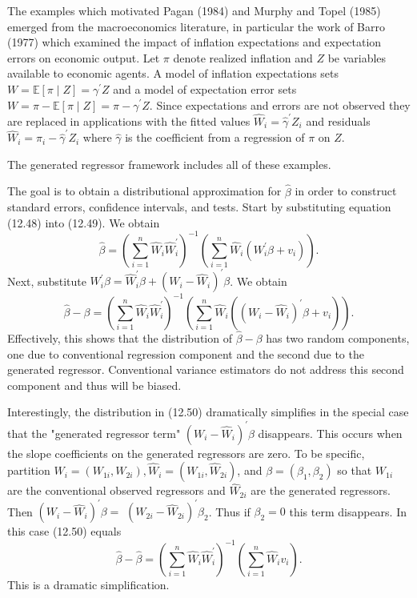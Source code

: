 \documentclass[10pt]{article}
\begin{document}
The examples which motivated Pagan (1984) and Murphy and Topel (1985) emerged from the macroeconomics literature, in particular the work of Barro (1977) which examined the impact of inflation expectations and expectation errors on economic output. Let $\pi$ denote realized inflation and $Z$ be variables available to economic agents. A model of inflation expectations sets $W=\mathbb{E}[\pi \mid Z]=\gamma^{\prime} Z$ and a model of expectation error sets $W=\pi-\mathbb{E}[\pi \mid Z]=\pi-\gamma^{\prime} Z$. Since expectations and errors are not observed they are replaced in applications with the fitted values $\widehat{W}_{i}=\widehat{\gamma}^{\prime} Z_{i}$ and residuals $\widehat{W}_{i}=\pi_{i}-\widehat{\gamma}^{\prime} Z_{i}$ where $\widehat{\gamma}$ is the coefficient from a regression of $\pi$ on $Z$.

The generated regressor framework includes all of these examples.

The goal is to obtain a distributional approximation for $\widehat{\beta}$ in order to construct standard errors, confidence intervals, and tests. Start by substituting equation (12.48) into (12.49). We obtain
$$
\widehat{\beta}=\left(\sum_{i=1}^{n} \widehat{W}_{i} \widehat{W}_{i}^{\prime}\right)^{-1}\left(\sum_{i=1}^{n} \widehat{W}_{i}\left(W_{i}^{\prime} \beta+v_{i}\right)\right) .
$$
Next, substitute $W_{i}^{\prime} \beta=\widehat{W}_{i}^{\prime} \beta+\left(W_{i}-\widehat{W}_{i}\right)^{\prime} \beta$. We obtain
$$
\widehat{\beta}-\beta=\left(\sum_{i=1}^{n} \widehat{W}_{i} \widehat{W}_{i}^{\prime}\right)^{-1}\left(\sum_{i=1}^{n} \widehat{W}_{i}\left(\left(W_{i}-\widehat{W}_{i}\right)^{\prime} \beta+v_{i}\right)\right) .
$$
Effectively, this shows that the distribution of $\widehat{\beta}-\beta$ has two random components, one due to conventional regression component and the second due to the generated regressor. Conventional variance estimators do not address this second component and thus will be biased.

Interestingly, the distribution in (12.50) dramatically simplifies in the special case that the "generated regressor term" $\left(W_{i}-\widehat{W}_{i}\right)^{\prime} \beta$ disappears. This occurs when the slope coefficients on the generated regressors are zero. To be specific, partition $W_{i}=\left(W_{1 i}, W_{2 i}\right), \widehat{W}_{i}=\left(W_{1 i}, \widehat{W}_{2 i}\right)$, and $\beta=\left(\beta_{1}, \beta_{2}\right)$ so that $W_{1 i}$ are the conventional observed regressors and $\widehat{W}_{2 i}$ are the generated regressors. Then $\left(W_{i}-\widehat{W}_{i}\right)^{\prime} \beta=$ $\left(W_{2 i}-\widehat{W}_{2 i}\right)^{\prime} \beta_{2}$. Thus if $\beta_{2}=0$ this term disappears. In this case (12.50) equals
$$
\widehat{\beta}-\widehat{\beta}=\left(\sum_{i=1}^{n} \widehat{W}_{i} \widehat{W}_{i}^{\prime}\right)^{-1}\left(\sum_{i=1}^{n} \widehat{W}_{i} v_{i}\right) .
$$
This is a dramatic simplification.
\end{document}
